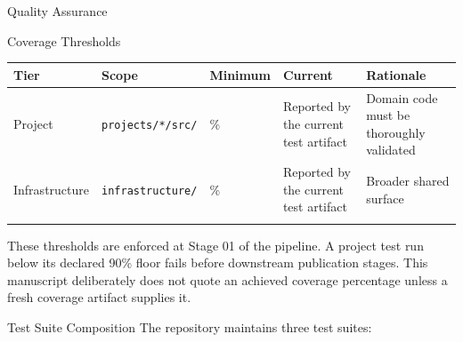 \documentclass[
  ignorenonframetext,
]{beamer}
\newcounter{none} %
\begin{document}
\begin{frame}{Quality Assurance}
\begin{block}{Coverage Thresholds}
{\def\LTcaptype{none} %
\begin{longtable}[]{@{}
  >{\raggedright\arraybackslash}p{}
  >{\raggedright\arraybackslash}p{}
  >{\centering\arraybackslash}p{}
  >{\centering\arraybackslash}p{}
  >{\raggedright\arraybackslash}p{}@{}}
\toprule\noalign{}
\begin{minipage}[b]{\linewidth}\raggedright
Tier
\end{minipage} & \begin{minipage}[b]{\linewidth}\raggedright
Scope
\end{minipage} & \begin{minipage}[b]{\linewidth}\centering
Minimum
\end{minipage} & \begin{minipage}[b]{\linewidth}\centering
Current
\end{minipage} & \begin{minipage}[b]{\linewidth}\raggedright
Rationale
\end{minipage} \\
\midrule\noalign{}
\endhead
Project & \texttt{projects/*/src/} & 90\% & Reported by the current test
artifact & Domain code must be thoroughly validated \\
Infrastructure & \texttt{infrastructure/} & 60\% & Reported by the
current test artifact & Broader shared surface \\
\bottomrule\noalign{}
\end{longtable}
}

These thresholds are enforced at Stage 01 of the pipeline. A project
test run below its declared 90\% floor fails before downstream
publication stages. This manuscript deliberately does not quote an
achieved coverage percentage unless a fresh coverage artifact supplies
it.
\end{block}

\begin{block}{Test Suite Composition}
\protect{}\label{test-suite-composition}
The repository maintains three test suites:


\end{block}
\end{frame}
\end{document}
